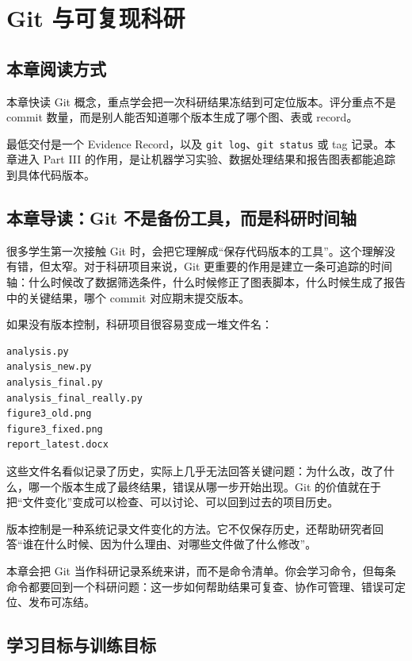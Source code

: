 \chapter{Git 与可复现科研}

\section{本章阅读方式}

本章快读 Git 概念，重点学会把一次科研结果冻结到可定位版本。评分重点不是 commit 数量，而是别人能否知道哪个版本生成了哪个图、表或 record。

最低交付是一个 Evidence Record，以及 \texttt{git log}、\texttt{git status} 或 tag 记录。本章进入 Part III 的作用，是让机器学习实验、数据处理结果和报告图表都能追踪到具体代码版本。

\section{本章导读：Git 不是备份工具，而是科研时间轴}

很多学生第一次接触 Git 时，会把它理解成“保存代码版本的工具”。这个理解没有错，但太窄。对于科研项目来说，Git 更重要的作用是建立一条可追踪的时间轴：什么时候改了数据筛选条件，什么时候修正了图表脚本，什么时候生成了报告中的关键结果，哪个 commit 对应期末提交版本。

如果没有版本控制，科研项目很容易变成一堆文件名：

\begin{lstlisting}[style=terminal]
analysis.py
analysis_new.py
analysis_final.py
analysis_final_really.py
figure3_old.png
figure3_fixed.png
report_latest.docx
\end{lstlisting}

这些文件名看似记录了历史，实际上几乎无法回答关键问题：为什么改，改了什么，哪一个版本生成了最终结果，错误从哪一步开始出现。Git 的价值就在于把“文件变化”变成可以检查、可以讨论、可以回到过去的项目历史。

\begin{defbox}[版本控制]
版本控制是一种系统记录文件变化的方法。它不仅保存历史，还帮助研究者回答“谁在什么时候、因为什么理由、对哪些文件做了什么修改”。
\end{defbox}

本章会把 Git 当作科研记录系统来讲，而不是命令清单。你会学习命令，但每条命令都要回到一个科研问题：这一步如何帮助结果可复查、协作可管理、错误可定位、发布可冻结。

\section{学习目标与训练目标}

